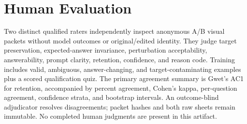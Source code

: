 \section{Human Evaluation}
Two distinct qualified raters independently inspect anonymous A/B visual packets without model
outcomes or original/edited identity. They judge target preservation, expected-answer invariance,
perturbation acceptability, answerability, prompt clarity, retention, confidence, and reason code.
Training includes valid, ambiguous, answer-changing, and target-contaminating examples plus a scored
qualification quiz. The primary agreement summary is Gwet's AC1 for retention, accompanied by percent
agreement, Cohen's kappa, per-question agreement, confidence strata, and bootstrap intervals. An
outcome-blind adjudicator resolves disagreements; packet hashes and both raw sheets remain immutable.
No completed human judgments are present in this artifact.
